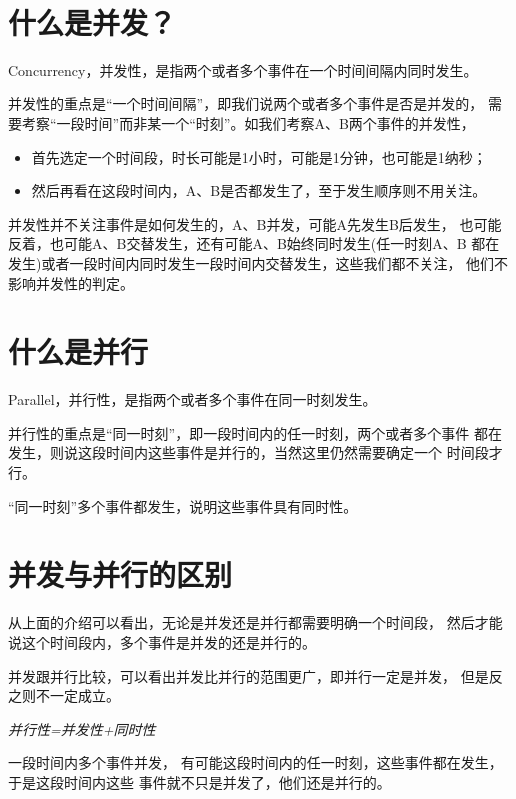 \documentclass[a4paper,11pt]{article}
\begin{document}
\tt %
\pagestyle{header}
\sybmaketitle
\newpage

\pagestyle{main}
\setcounter{page}{1}

\section[什么是并发？]{什么是并发？}
Concurrency，并发性，是指两个或者多个事件在一个时间间隔内同时发生。

并发性的重点是“一个时间间隔”，即我们说两个或者多个事件是否是并发的，
需要考察“一段时间”而非某一个“时刻”。如我们考察A、B两个事件的并发性，
\begin{itemize}
  \item 首先选定一个时间段，时长可能是1小时，可能是1分钟，也可能是1纳秒；
  \item 然后再看在这段时间内，A、B是否都发生了，至于发生顺序则不用关注。
\end{itemize}
并发性并不关注事件是如何发生的，A、B并发，可能A先发生B后发生，
也可能反着，也可能A、B交替发生，还有可能A、B始终同时发生(任一时刻A、B
都在发生)或者一段时间内同时发生一段时间内交替发生，这些我们都不关注，
他们不影响并发性的判定。

\section[什么是并行？]{什么是并行}
Parallel，并行性，是指两个或者多个事件在同一时刻发生。

并行性的重点是“同一时刻”，即一段时间内的任一时刻，两个或者多个事件
都在发生，则说这段时间内这些事件是并行的，当然这里仍然需要确定一个
时间段才行。

“同一时刻”多个事件都发生，说明这些事件具有同时性。

\section[并发与并行的区别]{并发与并行的区别}
从上面的介绍可以看出，无论是并发还是并行都需要明确一个时间段，
然后才能说这个时间段内，多个事件是并发的还是并行的。

并发跟并行比较，可以看出并发比并行的范围更广，即并行一定是并发，
但是反之则不一定成立。

\begin{center}
  \emph{并行性=并发性+同时性}
\end{center}

一段时间内多个事件并发，
有可能这段时间内的任一时刻，这些事件都在发生，于是这段时间内这些
事件就不只是并发了，他们还是并行的。
\end{document}
